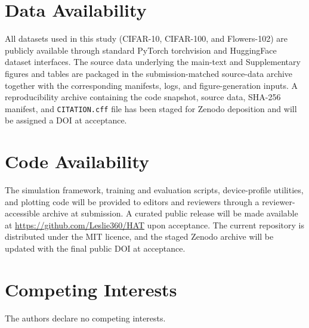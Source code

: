 \section*{Data Availability}
All datasets used in this study (CIFAR-10, CIFAR-100, and Flowers-102) are publicly available through standard PyTorch torchvision and HuggingFace dataset interfaces. The source data underlying the main-text and Supplementary figures and tables are packaged in the submission-matched source-data archive together with the corresponding manifests, logs, and figure-generation inputs. A reproducibility archive containing the code snapshot, source data, SHA-256 manifest, and \texttt{CITATION.cff} file has been staged for Zenodo deposition and will be assigned a DOI at acceptance.

\section*{Code Availability}
The simulation framework, training and evaluation scripts, device-profile utilities, and plotting code will be provided to editors and reviewers through a reviewer-accessible archive at submission. A curated public release will be made available at \url{https://github.com/Leslie360/HAT} upon acceptance. The current repository is distributed under the MIT licence, and the staged Zenodo archive will be updated with the final public DOI at acceptance.

\section*{Competing Interests}
The authors declare no competing interests.
